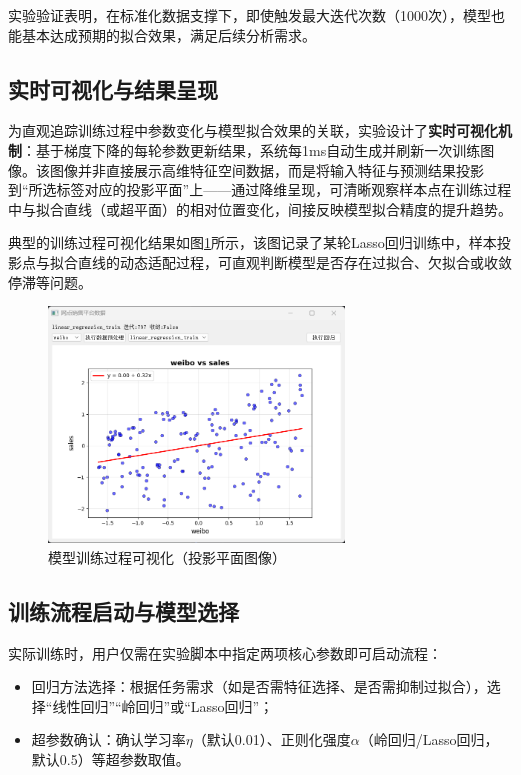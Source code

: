 实验验证表明，在标准化数据支撑下，即使触发最大迭代次数（1000次），模型也能基本达成预期的拟合效果，满足后续分析需求。

\subsection{实时可视化与结果呈现}
为直观追踪训练过程中参数变化与模型拟合效果的关联，实验设计了\textbf{实时可视化机制}：基于梯度下降的每轮参数更新结果，系统每1ms自动生成并刷新一次训练图像。该图像并非直接展示高维特征空间数据，而是将输入特征与预测结果投影到“所选标签对应的投影平面”上——通过降维呈现，可清晰观察样本点在训练过程中与拟合直线（或超平面）的相对位置变化，间接反映模型拟合精度的提升趋势。

典型的训练过程可视化结果如图\ref{fig:train_process}所示，该图记录了某轮Lasso回归训练中，样本投影点与拟合直线的动态适配过程，可直观判断模型是否存在过拟合、欠拟合或收敛停滞等问题。

\begin{figure}[!htb]
    \centering
    \includegraphics[width=0.70\textwidth]{./figures/train.png}
    \caption{模型训练过程可视化（投影平面图像）}
    \label{fig:train_process} %
\end{figure}

\subsection{训练流程启动与模型选择}
实际训练时，用户仅需在实验脚本中指定两项核心参数即可启动流程：
\begin{itemize}
    \item[1] 回归方法选择：根据任务需求（如是否需特征选择、是否需抑制过拟合），选择“线性回归”“岭回归”或“Lasso回归”；
    \item[2] 超参数确认：确认学习率$\eta$（默认0.01）、正则化强度$\alpha$（岭回归/Lasso回归，默认0.5）等超参数取值。
\end{itemize}

